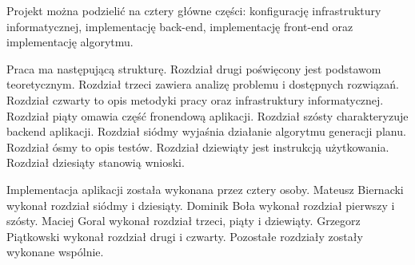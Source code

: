 Projekt można podzielić na cztery główne części: konfigurację infrastruktury informatycznej, implementację back-end, implementację front-end oraz implementację algorytmu.

Praca ma następującą strukturę. Rozdział drugi poświęcony jest podstawom teoretycznym. Rozdział trzeci zawiera analizę problemu i dostępnych rozwiązań. Rozdział czwarty to opis metodyki pracy oraz infrastruktury informatycznej. Rozdział piąty omawia część fronendową aplikacji. Rozdział szósty charakteryzuje backend aplikacji. Rozdział siódmy wyjaśnia działanie algorytmu generacji planu. Rozdział ósmy to opis testów. Rozdział dziewiąty jest instrukcją użytkowania. Rozdział dziesiąty stanowią wnioski. 

Implementacja aplikacji została wykonana przez cztery osoby.
Mateusz Biernacki wykonał rozdział siódmy i dziesiąty.
Dominik Boła wykonał rozdział pierwszy i szósty.
Maciej Goral wykonał rozdział trzeci, piąty i dziewiąty.
Grzegorz Piątkowski wykonał rozdział drugi i czwarty.
Pozostałe rozdziały zostały wykonane wspólnie.
